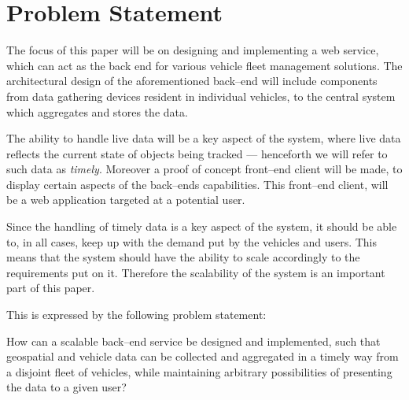 \section{Problem Statement}\label{sec:problem_statement}

The focus of this paper will be on designing and implementing a web service,
which can act as the back end for various vehicle fleet management solutions.
The architectural design of the aforementioned back--end will include components
from data gathering devices resident in individual vehicles,
to the central system which aggregates and stores the data.

The ability to handle live data will be a key aspect of the system,
where live data reflects the current state of objects being tracked
--- henceforth we will refer to such data as \textit{timely}.
Moreover a proof of concept front--end client will be made,
to display certain aspects of the back--ends capabilities.
This front--end client, will be a web application targeted at a potential user.

Since the handling of timely data is a key aspect of the system,
it should be able to, in all cases, keep up with the demand put by the vehicles and users.
This means that the system should have the ability to scale accordingly to the requirements put on it.
Therefore the scalability of the system is an important part of this paper.

\bigskip\noindent
This is expressed by the following problem statement:

\medskip
{\addtolength{\leftskip}{10mm}\addtolength{\rightskip}{10mm}\noindent\hrulefill\it

\noindent How can a scalable back--end service be designed and implemented,
such that geospatial and vehicle data can be collected and aggregated in a timely way from a disjoint fleet of vehicles,
while maintaining arbitrary possibilities of presenting the data to a given user?

\noindent\hrulefill

}
